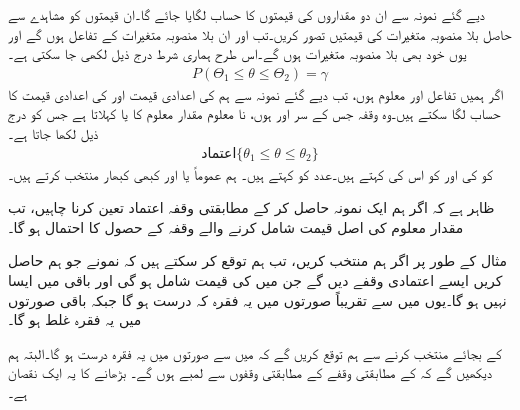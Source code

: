 دیے گئے نمونہ  سے ان دو مقداروں کی قیمتوں کا حساب لگایا جائے گا۔ان  قیمتوں کو مشاہدے سے حاصل  بلا منصوبہ متغیرات  کی قیمتیں تصور کریں۔تب  اور  ان بلا منصوبہ متغیرات کے تفاعل ہوں گے اور یوں خود بھی بلا منصوبہ متغیرات ہوں گے۔اس طرح ہماری شرط درج ذیل لکھی جا سکتی ہے۔
\begin{align*}
P(\Theta_1\le \theta \le \Theta_2)=\gamma
\end{align*}
اگر ہمیں تفاعل  اور  معلوم ہوں، تب دیے گئے نمونہ سے ہم  کی  اعدادی قیمت  اور  کی اعدادی قیمت  کا حساب لگا سکتے ہیں۔وہ وقفہ جس کے سر  اور  ہوں، نا معلوم مقدار معلوم  کا   یا  کہلاتا ہے جس کو درج ذیل لکھا جاتا ہے۔
\begin{align*}
\text{اعتماد}\{\theta_1\le \theta\le \theta_2\}
\end{align*}
 کو   کی  اور  کو اس کی   کہتے ہیں۔عدد  کو  کہتے ہیں۔ ہم عموماً  یا  اور کبھی کبھار  منتخب کرتے ہیں۔

ظاہر ہے کہ اگر ہم ایک نمونہ حاصل کر کے مطابقتی وقفہ اعتماد تعین کرنا چاہیں، تب مقدار معلوم کی اصل قیمت شامل کرنے والے وقفہ کے حصول کا احتمال  ہو گا۔

مثال کے طور پر اگر ہم  منتخب  کریں، تب ہم توقع کر سکتے ہیں کہ  نمونے جو ہم حاصل کریں ایسے اعتمادی وقفے دیں گے جن میں  کی قیمت شامل ہو گی اور باقی  میں ایسا نہیں ہو گا۔یوں  میں سے تقریباً  صورتوں میں  یہ فقرہ کہ   درست ہو گا جبکہ باقی صورتوں میں یہ فقرہ غلط ہو گا۔

 کے بجائے  منتخب کرنے سے ہم توقع کریں گے کہ  میں سے  صورتوں میں یہ فقرہ درست ہو گا۔البتہ ہم دیکھیں گے کہ  کے مطابقتی وقفے  کے مطابقتی وقفوں سے  لمبے ہوں گے۔ بڑھانے کا یہ ایک نقصان ہے۔ 

